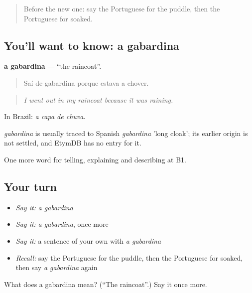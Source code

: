 \label{lesson:PT-C466-gabardina}



\begin{quote}
Before the new one: say the Portuguese for the puddle, then the Portuguese for soaked.
\end{quote}

\subsection*{You'll want to know: a gabardina}
\textbf{a gabardina} — \textquotedblleft{}the raincoat\textquotedblright{}.

\begin{quote}
Saí de gabardina porque estava a chover.
\end{quote}

\begin{quote}
\emph{I went out in my raincoat because it was raining.}
\end{quote}

In Brazil: \emph{a capa de chuva}.

\begin{cousinweb}
\emph{gabardina} is usually traced to Spanish \emph{gabardina} 'long cloak'; its earlier origin is not settled, and EtymDB has no entry for it.
\end{cousinweb}

\begin{grammarlens}[title={What you've built}]
One more word for telling, explaining and describing at B1.
\end{grammarlens}

\subsection*{Your turn}
\begin{itemize}
\raggedright
  \item \emph{Say it:} \emph{a gabardina}
  \item \emph{Say it:} \emph{a gabardina}, once more
  \item \emph{Say it:} a sentence of your own with \emph{a gabardina}
  \item \emph{Recall:} say the Portuguese for the puddle, then the Portuguese for soaked, then say \emph{a gabardina} again
\end{itemize}

\begin{tcolorbox}[breakable,colback=teal!4,colframe=teal!35!black,title={Before you move on}]
What does a gabardina mean? (\textquotedblleft{}The raincoat\textquotedblright{}.) Say it once more.
\end{tcolorbox}
